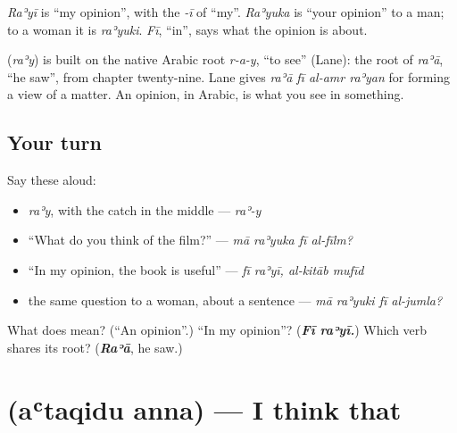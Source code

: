 \emph{Raʾyī} is \textquotedblleft{}my opinion\textquotedblright{}, with the \emph{-ī} of \textquotedblleft{}my\textquotedblright{}. \emph{Raʾyuka} is \textquotedblleft{}your opinion\textquotedblright{} to a man; to a woman it is \emph{raʾyuki}. \emph{Fī}, \textquotedblleft{}in\textquotedblright{}, says what the opinion is about.

\begin{cousinweb}
\textbf{} (\emph{raʾy}) is built on the native Arabic root \emph{r-a-y}, \textquotedblleft{}to see\textquotedblright{} (Lane): the root of \emph{raʾā}, \textquotedblleft{}he saw\textquotedblright{}, from chapter twenty-nine. Lane gives \emph{raʾā fī al-amr raʾyan} for forming a view of a matter. An opinion, in Arabic, is what you see in something.
\end{cousinweb}

\subsection*{Your turn}
Say these aloud:

\begin{itemize}
\raggedright
  \item \emph{raʾy}, with the catch in the middle — \emph{raʾ-y}
  \item \textquotedblleft{}What do you think of the film?\textquotedblright{} — \emph{mā raʾyuka fī al-fīlm?}
  \item \textquotedblleft{}In my opinion, the book is useful\textquotedblright{} — \emph{fī raʾyī, al-kitāb mufīd}
  \item the same question to a woman, about a sentence — \emph{mā raʾyuki fī al-jumla?}
\end{itemize}

\begin{tcolorbox}[breakable,colback=teal!4,colframe=teal!35!black,title={Before you move on}]
What does  mean? (\textquotedblleft{}An opinion\textquotedblright{}.) \textquotedblleft{}In my opinion\textquotedblright{}? (\emph{\textbf{Fī raʾyī.}}) Which verb shares its root? (\emph{\textbf{Raʾā}}, he saw.)
\end{tcolorbox}
\section[\texorpdfstring{\ar{أعتقد} \ar{أن} (aʿtaqidu anna)}{أعتقد أن (aʿtaqidu anna)}]{  (aʿtaqidu anna) — I think that}

\label{lesson:AR-C285-ataqidu-anna}



